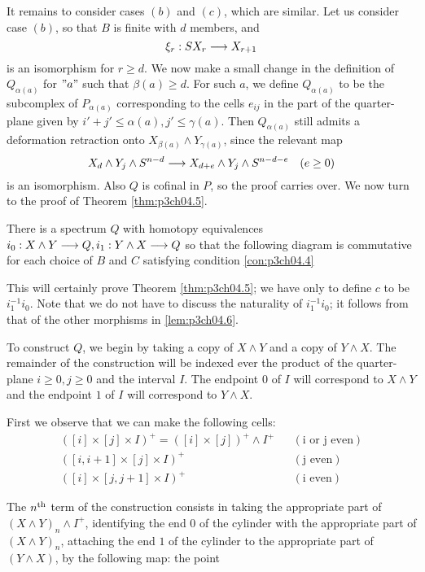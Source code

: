 \documentclass[../main]{subfiles}
\begin{document}
It remains to consider cases $(b)$ and $(c)$, which are similar. Let us consider case $(b)$, so that $B$ is finite with $d$ members, and $$\xi_r:SX_r\overset{}{\longrightarrow}X_{r+1}$$ is an isomorphism for $r\geq d$. We now make a small change in the definition of $Q_{\alpha(a)}$ for $"a"$ such that $\beta(a)\geq d$. For such $a$, we define $Q_{\alpha(a)}$ to be the subcomplex of $P_{\alpha(a)}$ corresponding to the cells $e_{ij}$ in the part of the quarter-plane given by $i'+j'\leq \alpha(a),j'\leq  \gamma(a)$. Then $Q_{\alpha(a)}$ still admits a deformation retraction onto $X_{\beta(a)}\wedge Y_{\gamma(a)}$, since the relevant map
$$X_d\wedge Y_j \wedge S^{n-d} \overset{}{\longrightarrow} X_{d+e} \wedge Y_j \wedge S^{n-d-e}\quad (e\geq 0)$$
is an isomorphism. Also $Q$ is cofinal in $P$, so the proof carries over. We now turn to the proof of Theorem \ref{thm:p3ch04.5}.
\begin{lemma}\label{lem:p3ch04.6}
There is a spectrum $Q$ with homotopy equivalences $i_0:X\wedge Y\overset{}{\longrightarrow} Q,i_1:Y\wedge X\overset{}{\longrightarrow} Q$ so that the following diagram is commutative for each choice of $B$ and $C$ satisfying condition \ref{con:p3ch04.4}

\end{lemma}

This will certainly prove Theorem \ref{thm:p3ch04.5}; we have only to define $c$ to be $i_1^{-1}i_0$. Note that we do not have to discuss the naturality of $i_1^{-1} i_0$; it follows from that of the other morphisms in \ref{lem:p3ch04.6}.

To construct $Q$, we begin by taking a copy of $X\wedge Y$ and a copy of $Y\wedge X$. The remainder of the construction will be indexed ever the product
of the quarter-plane $i\geq 0,j\geq 0$ and the interval $I$. The endpoint $0$ of $I$ will correspond to $X\wedge Y$ and the endpoint $1$ of $I$ will correspond to $Y\wedge X$.

First we observe that we can make the following cells:
\begin{align*}
    ([i]\times[j]\times I)^+=([i]\times [j])^+\wedge I^+ && (\text{i or j even})\\
    ([i,i+1]\times [j]\times I)^+ && (\text{j even})\\
    ([i]\times [j,j+1]\times I)^+ && (\text{i even})
\end{align*}

The $n^{\text{th}}$ term of the construction consists in taking the appropriate part of $(X\wedge Y)_n \wedge I^+$, identifying the end $0$ of the cylinder with the appropriate part of $(X\wedge Y)_n$, attaching the end $1$ of the cylinder to the appropriate part of $(Y\wedge X)$, by the following map: the point
\end{document}
